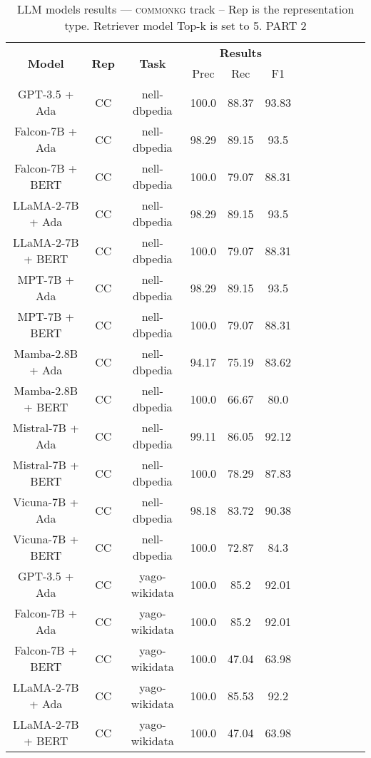 \begin{table}
        \centering
        \small
        \caption{LLM models results --- \textsc{commonkg} track -- Rep is the representation type. Retriever model Top-k is set to 5. PART 2 } \label{tab:llm_commonkg2}
        \begin{tabular}{|c|c|c|c|c|c|c|c|c|c|c|c|}
            \hline
             \multirow{2}{*}{\textbf{Model}}  & \multirow{2}{*}{\textbf{Rep}}  & \multirow{2}{*}{\textbf{Task}} &  \multicolumn{3}{c|}{\textbf{Results}} \\
             \cline{4-6}
              & & & Prec & Rec & F1  \\
            \hline
	GPT-3.5 + Ada  & CC & nell-dbpedia  &  100.0 &  88.37 & 93.83  \\
	Falcon-7B + Ada  & CC & nell-dbpedia  &  98.29 &  89.15 & 93.5  \\
	Falcon-7B + BERT  & CC & nell-dbpedia  &  100.0 &  79.07 & 88.31  \\
	LLaMA-2-7B + Ada  & CC & nell-dbpedia  &  98.29 &  89.15 & 93.5  \\
	LLaMA-2-7B + BERT  & CC & nell-dbpedia  &  100.0 &  79.07 & 88.31  \\
	MPT-7B + Ada  & CC & nell-dbpedia  &  98.29 &  89.15 & 93.5  \\
	MPT-7B + BERT  & CC & nell-dbpedia  &  100.0 &  79.07 & 88.31  \\
	Mamba-2.8B + Ada  & CC & nell-dbpedia  &  94.17 &  75.19 & 83.62  \\
	Mamba-2.8B + BERT  & CC & nell-dbpedia  &  100.0 &  66.67 & 80.0  \\
	Mistral-7B + Ada  & CC & nell-dbpedia  &  99.11 &  86.05 & 92.12  \\
	Mistral-7B + BERT  & CC & nell-dbpedia  &  100.0 &  78.29 & 87.83  \\
	Vicuna-7B + Ada  & CC & nell-dbpedia  &  98.18 &  83.72 & 90.38  \\
	Vicuna-7B + BERT  & CC & nell-dbpedia  &  100.0 &  72.87 & 84.3  \\
	\hline
	GPT-3.5 + Ada  & CC & yago-wikidata  &  100.0 &  85.2 & 92.01  \\
	Falcon-7B + Ada  & CC & yago-wikidata  &  100.0 &  85.2 & 92.01  \\
	Falcon-7B + BERT  & CC & yago-wikidata  &  100.0 &  47.04 & 63.98  \\
	LLaMA-2-7B + Ada  & CC & yago-wikidata  &  100.0 &  85.53 & 92.2  \\
	LLaMA-2-7B + BERT  & CC & yago-wikidata  &  100.0 &  47.04 & 63.98  \\

\end{tabular}
\end{table}
